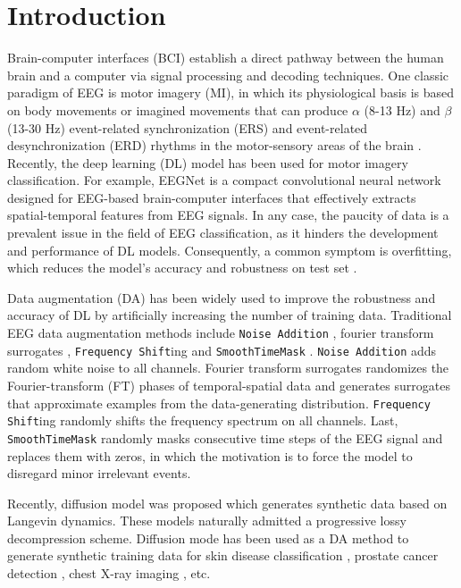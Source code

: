 \section{Introduction}

Brain-computer interfaces (BCI) establish a direct pathway between the human brain and a computer via signal processing and decoding techniques. 
One classic paradigm of EEG is motor imagery (MI), in which its physiological basis is based on body movements or imagined movements that can produce $\alpha$ (8-13 Hz) and $\beta$ (13-30 Hz) event-related synchronization (ERS) and event-related desynchronization (ERD) rhythms in the motor-sensory areas of the brain \cite{wolpaw2013brain}. 
Recently, the deep learning (DL) model has been used for motor imagery classification. 
For example, EEGNet \cite{lawhern2018eegnet} is a compact convolutional neural network designed for EEG-based brain-computer interfaces that effectively extracts spatial-temporal features from EEG signals.
In any case, the paucity of data is a prevalent issue in the field of EEG classification, as it hinders the development and performance of DL models.
Consequently, a common symptom is overfitting, which reduces the model's accuracy and robustness on test set \cite{bilbao2017overfitting}. 

Data augmentation (DA) has been widely used to improve the robustness and accuracy of DL by artificially increasing the number of training data.
Traditional EEG data augmentation methods include \texttt{Noise Addition} \cite{wang2018data,parvan2019transfer,li2019channel}, fourier transform surrogates \cite{schwabedal2018addressing}, \texttt{Frequency Shift}ing \cite{rommel2021cadda,rommel2022data} and \texttt{\texttt{SmoothTimeMask}} \cite{mohsenvand2020contrastive}.
\texttt{Noise Addition} \cite{li2019channel,parvan2019transfer} adds random white noise to all channels.
Fourier transform surrogates \cite{schwabedal2018addressing} randomizes the Fourier-transform (FT) phases of temporal-spatial data and generates surrogates that approximate examples from the data-generating distribution. \texttt{Frequency Shift}ing \cite{rommel2021cadda,rommel2022data} randomly shifts the frequency spectrum on all channels.
Last, \texttt{\texttt{SmoothTimeMask}} \cite{mohsenvand2020contrastive} randomly masks consecutive time steps of the EEG signal and replaces them with zeros, in which the motivation is to force the model to disregard minor irrelevant events.

Recently, diffusion model \cite{ho2020denoising} was proposed which generates synthetic data based on Langevin dynamics.
These models naturally admitted a progressive lossy decompression scheme.
Diffusion mode has been used as a DA method to generate synthetic training data for skin disease classification \cite{akrout2023diffusion}, prostate cancer detection \cite{hao2021comprehensive}, chest X-ray imaging \cite{motamed2021data}, etc.


